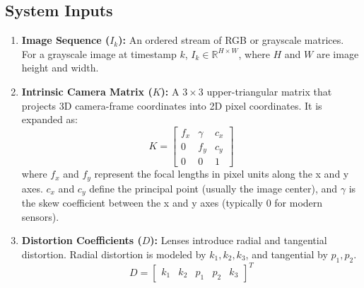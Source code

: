 \documentclass[12pt]{article}
\begin{document}
\subsection{System Inputs}
\begin{enumerate}
    \item \textbf{Image Sequence ($I_k$):} An ordered stream of RGB or grayscale matrices. For a grayscale image at timestamp $k$, $I_k \in \mathbb{R}^{H \times W}$, where $H$ and $W$ are image height and width.
    
    \item \textbf{Intrinsic Camera Matrix ($K$):} A $3 \times 3$ upper-triangular matrix that projects 3D camera-frame coordinates into 2D pixel coordinates. It is expanded as:
    \begin{equation}
        K = \begin{bmatrix} 
        f_x & \gamma & c_x \\ 
        0 & f_y & c_y \\ 
        0 & 0 & 1 
        \end{bmatrix}
    \end{equation}
    where $f_x$ and $f_y$ represent the focal lengths in pixel units along the x and y axes. $c_x$ and $c_y$ define the principal point (usually the image center), and $\gamma$ is the skew coefficient between the x and y axes (typically $0$ for modern sensors).

    \item \textbf{Distortion Coefficients ($D$):} Lenses introduce radial and tangential distortion. Radial distortion is modeled by $k_1, k_2, k_3$, and tangential by $p_1, p_2$. 
    \begin{equation}
        D = \begin{bmatrix} k_1 & k_2 & p_1 & p_2 & k_3 \end{bmatrix}^T
    \end{equation}
\end{enumerate}
\end{document}
